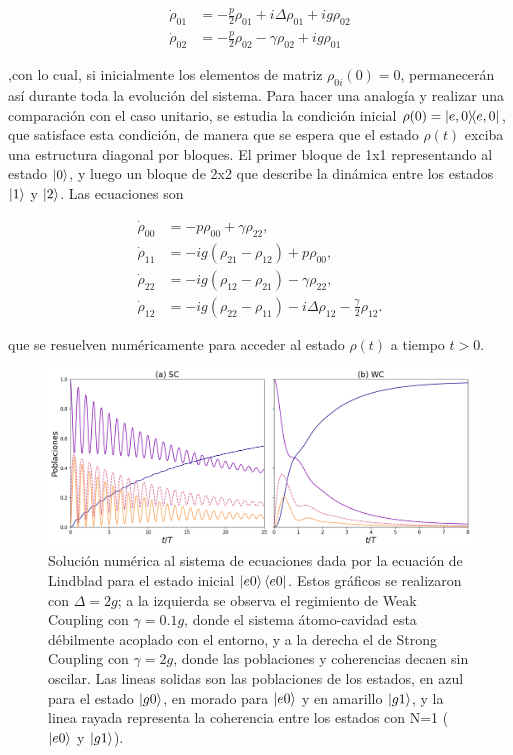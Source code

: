 \begin{equation}
    \begin{aligned}
        \dot \rho_{01} & =-\frac{p}{2} \rho_{01}+i\Delta\rho_{01}+ig\rho_{02} \\
        \dot \rho_{02} & =-\frac{p}{2} \rho_{02}-\gamma \rho_{02}+ig\rho_{01}
    \end{aligned}
\end{equation}

,con lo cual, si inicialmente los elementos de matriz $\rho_{0i}(0)=0$, permanecerán así durante toda la evolución del sistema. Para hacer una analogía y realizar una comparación con el caso unitario, se estudia la condición inicial $\rho(0)=\ketbra{e,0}{e,0}$, que satisface esta condición, de manera que se espera que el estado $\rho(t)$ exciba una estructura diagonal por bloques. El primer bloque de 1x1 representando al estado $\ket{0}$, y luego un bloque de 2x2 que describe la dinámica entre los estados $\ket{1}$ y $\ket{2}$. Las ecuaciones son

\begin{equation}
\begin{aligned}
\dot{\rho}_{00} &= -p \rho_{00} + \gamma \rho_{22}, \\
\dot{\rho}_{11} &= -i g (\rho_{21} - \rho_{12}) + p \rho_{00}, \\
\dot{\rho}_{22} &= -i g (\rho_{12} - \rho_{21}) - \gamma \rho_{22}, \\
\dot{\rho}_{12} &= -i g (\rho_{22} - \rho_{11}) - i \Delta \rho_{12} - \frac{\gamma}{2} \rho_{12}.
\end{aligned}
\end{equation}

que se resuelven numéricamente para acceder al estado $\rho(t)$ a tiempo $t>0$. 

\begin{figure}[H]
    \centering
    \includegraphics[width=\textwidth]{figuras/ch3/poblaciones sc vs wc.png}
    \caption{Solución numérica al sistema de ecuaciones dada por la ecuación de Lindblad para el estado inicial $\ket{e0}\bra{e0}$. Estos gráficos se realizaron con $\Delta=2g$; a la izquierda se observa el regimiento de Weak Coupling con $\gamma=0.1g$, donde el sistema átomo-cavidad esta débilmente acoplado con el entorno, y a la derecha el de Strong Coupling con $\gamma=2g$, donde las poblaciones y coherencias decaen sin oscilar. Las lineas solidas son las poblaciones de los estados, en azul para el estado $\ket{g0}$, en morado para $\ket{e0}$ y en amarillo $\ket{g1}$, y la linea rayada representa la coherencia entre los estados con N=1 ($\ket{e0}$ y $\ket{g1}$). }
    \label{fig3:poblaciones e0}
\end{figure}

